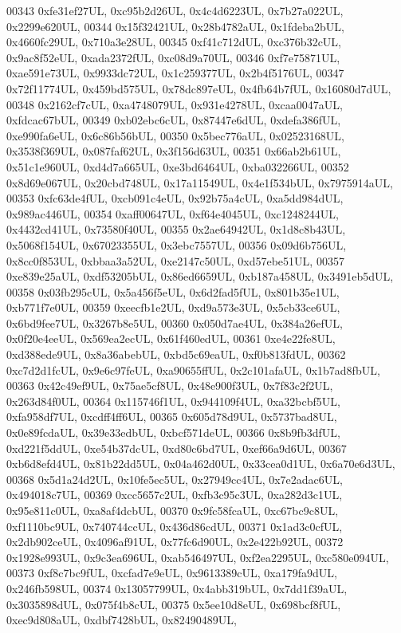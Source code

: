 \begin{DoxyCode}
00343     0xfe31ef27UL, 0xc95b2d26UL, 0x4c4d6223UL, 0x7b27a022UL, 0x2299e620UL,
00344     0x15f32421UL, 0x28b4782aUL, 0x1fdeba2bUL, 0x4660fc29UL, 0x710a3e28UL,
00345     0xf41c712dUL, 0xc376b32cUL, 0x9ac8f52eUL, 0xada2372fUL, 0xc08d9a70UL,
00346     0xf7e75871UL, 0xae591e73UL, 0x9933dc72UL, 0x1c259377UL, 0x2b4f5176UL,
00347     0x72f11774UL, 0x459bd575UL, 0x78dc897eUL, 0x4fb64b7fUL, 0x16080d7dUL,
00348     0x2162cf7cUL, 0xa4748079UL, 0x931e4278UL, 0xcaa0047aUL, 0xfdcac67bUL,
00349     0xb02ebc6cUL, 0x87447e6dUL, 0xdefa386fUL, 0xe990fa6eUL, 0x6c86b56bUL,
00350     0x5bec776aUL, 0x02523168UL, 0x3538f369UL, 0x087faf62UL, 0x3f156d63UL,
00351     0x66ab2b61UL, 0x51c1e960UL, 0xd4d7a665UL, 0xe3bd6464UL, 0xba032266UL,
00352     0x8d69e067UL, 0x20cbd748UL, 0x17a11549UL, 0x4e1f534bUL, 0x7975914aUL,
00353     0xfc63de4fUL, 0xcb091c4eUL, 0x92b75a4cUL, 0xa5dd984dUL, 0x989ac446UL,
00354     0xaff00647UL, 0xf64e4045UL, 0xc1248244UL, 0x4432cd41UL, 0x73580f40UL,
00355     0x2ae64942UL, 0x1d8c8b43UL, 0x5068f154UL, 0x67023355UL, 0x3ebc7557UL,
00356     0x09d6b756UL, 0x8cc0f853UL, 0xbbaa3a52UL, 0xe2147c50UL, 0xd57ebe51UL,
00357     0xe839e25aUL, 0xdf53205bUL, 0x86ed6659UL, 0xb187a458UL, 0x3491eb5dUL,
00358     0x03fb295cUL, 0x5a456f5eUL, 0x6d2fad5fUL, 0x801b35e1UL, 0xb771f7e0UL,
00359     0xeecfb1e2UL, 0xd9a573e3UL, 0x5cb33ce6UL, 0x6bd9fee7UL, 0x3267b8e5UL,
00360     0x050d7ae4UL, 0x384a26efUL, 0x0f20e4eeUL, 0x569ea2ecUL, 0x61f460edUL,
00361     0xe4e22fe8UL, 0xd388ede9UL, 0x8a36abebUL, 0xbd5c69eaUL, 0xf0b813fdUL,
00362     0xc7d2d1fcUL, 0x9e6c97feUL, 0xa90655ffUL, 0x2c101afaUL, 0x1b7ad8fbUL,
00363     0x42c49ef9UL, 0x75ae5cf8UL, 0x48e900f3UL, 0x7f83c2f2UL, 0x263d84f0UL,
00364     0x115746f1UL, 0x944109f4UL, 0xa32bcbf5UL, 0xfa958df7UL, 0xcdff4ff6UL,
00365     0x605d78d9UL, 0x5737bad8UL, 0x0e89fcdaUL, 0x39e33edbUL, 0xbcf571deUL,
00366     0x8b9fb3dfUL, 0xd221f5ddUL, 0xe54b37dcUL, 0xd80c6bd7UL, 0xef66a9d6UL,
00367     0xb6d8efd4UL, 0x81b22dd5UL, 0x04a462d0UL, 0x33cea0d1UL, 0x6a70e6d3UL,
00368     0x5d1a24d2UL, 0x10fe5ec5UL, 0x27949cc4UL, 0x7e2adac6UL, 0x494018c7UL,
00369     0xcc5657c2UL, 0xfb3c95c3UL, 0xa282d3c1UL, 0x95e811c0UL, 0xa8af4dcbUL,
00370     0x9fc58fcaUL, 0xc67bc9c8UL, 0xf1110bc9UL, 0x740744ccUL, 0x436d86cdUL,
00371     0x1ad3c0cfUL, 0x2db902ceUL, 0x4096af91UL, 0x77fc6d90UL, 0x2e422b92UL,
00372     0x1928e993UL, 0x9c3ea696UL, 0xab546497UL, 0xf2ea2295UL, 0xc580e094UL,
00373     0xf8c7bc9fUL, 0xcfad7e9eUL, 0x9613389cUL, 0xa179fa9dUL, 0x246fb598UL,
00374     0x13057799UL, 0x4abb319bUL, 0x7dd1f39aUL, 0x3035898dUL, 0x075f4b8cUL,
00375     0x5ee10d8eUL, 0x698bcf8fUL, 0xec9d808aUL, 0xdbf7428bUL, 0x82490489UL,

\end{DoxyCode}
